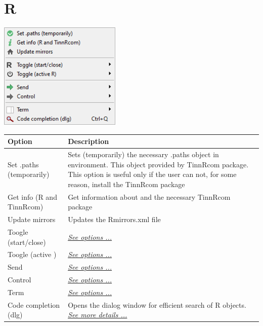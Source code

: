 
\hypertarget{menu_r}{}
\section{R}

\includegraphics[scale=0.8]{./res/menu_r.png}\\

\begin{scriptsize}
  \begin{tabularx}{\textwidth}{>{\hsize=0.5\hsize}X>{\hsize=0.7\hsize}X}\\
    \hline
    \textbf{Option} & \textbf{Description} \\
    \hline
    Set .paths (temporarily) & Sets (temporarily) the necessary .paths object in \RR{} environment.
     This object provided by TinnRcom package. This option is useful only if the user can not,
     for some reason, install the TinnRcom package \\
    Get info (R and TinnRcom) & Get information about \RR{} and the necessary TinnRcom package \\
    Update mirrors & Updates the Rmirrors.xml file \\
    \hdashline[1pt/1pt]
    Toogle (start/close) & \textit{\href{\#menu\_r\_toogle\_start}{See options ...}} \\
    Toogle (active \RR{}) & \textit{\href{\#menu\_r\_toogle\_active}{See options ...}} \\
    \hdashline[1pt/1pt]
    Send & \textit{\href{\#menu\_r\_send}{See options ...}} \\
    Control & \textit{\href{\#menu\_r\_control}{See options ...}} \\
    \hdashline[1pt/1pt]
    Term & \textit{\href{\#menu\_r\_term}{See options ...}} \\
    Code completion (dlg) & Opens the dialog window for efficient search of R objects.
    \textit{\href{\#additional_dialogs_code_completion}{See more details ...}} \\
    \hline
  \end{tabularx}
\end{scriptsize}


